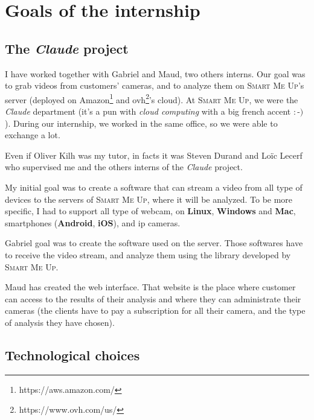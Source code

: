 \documentclass[a4paper,11pt]{custom}
\newcommand{\smu}{\textsc{Smart Me Up}\xspace}
\newcommand{\linux}{\textbf{Linux}\xspace}
\newcommand{\win}{\textbf{Windows}\xspace}
\newcommand{\mac}{\textbf{Mac}\xspace}
\newcommand{\android}{\textbf{Android}\xspace}
\newcommand{\ios}{\textbf{iOS}\xspace}
\newcommand{\claude}{\textit{Claude}\xspace}
\begin{document}
\chapter{Goals of the internship}

\section{The \claude{} project}

I have worked together with Gabriel and Maud, two others interns. Our goal was
to grab videos from customers' cameras, and to analyze them on \smu's server
(deployed on Amazon\footnote{https://aws.amazon.com/} and
ovh\footnote{https://www.ovh.com/us/}'s cloud). At \smu, we were the \claude{}
department (it's a pun with
\textit{cloud computing} with a big french accent $:$-$)$ ). During our
internship, we worked in the same office, so we were able to exchange a lot.

Even if Oliver Kilh was my tutor, in facts it was Steven Durand and Loïc Lecerf
who supervised me and the others interns of the \claude{} project.

My initial goal was to create a software that can stream a video from all type of
devices to the servers of \smu, where it will be analyzed. To be more specific,
I had to support all type of webcam, on \linux, \win{} and \mac, smartphones
(\android, \ios), and ip cameras.

Gabriel goal was to create the software used on the server. Those softwares
have to receive the video stream, and analyze them using the library developed
by \smu.

Maud has created the web interface. That website is the place where customer can
access to the results of their analysis and where they can administrate their
cameras (the clients have to pay a subscription for all their camera, and the
type of analysis they have chosen).

\section{Technological choices}
\end{document}
